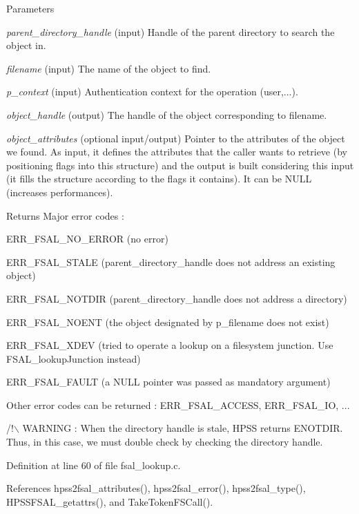\begin{DoxyParams}{Parameters}
\item[{\em parent\_\-directory\_\-handle}](input) Handle of the parent directory to search the object in. \item[{\em filename}](input) The name of the object to find. \item[{\em p\_\-context}](input) Authentication context for the operation (user,...). \item[{\em object\_\-handle}](output) The handle of the object corresponding to filename. \item[{\em object\_\-attributes}](optional input/output) Pointer to the attributes of the object we found. As input, it defines the attributes that the caller wants to retrieve (by positioning flags into this structure) and the output is built considering this input (it fills the structure according to the flags it contains). It can be NULL (increases performances).\end{DoxyParams}
\begin{DoxyReturn}{Returns}
Major error codes :
\begin{DoxyItemize}
\item ERR\_\-FSAL\_\-NO\_\-ERROR (no error)
\item ERR\_\-FSAL\_\-STALE (parent\_\-directory\_\-handle does not address an existing object)
\item ERR\_\-FSAL\_\-NOTDIR (parent\_\-directory\_\-handle does not address a directory)
\item ERR\_\-FSAL\_\-NOENT (the object designated by p\_\-filename does not exist)
\item ERR\_\-FSAL\_\-XDEV (tried to operate a lookup on a filesystem junction. Use FSAL\_\-lookupJunction instead)
\item ERR\_\-FSAL\_\-FAULT (a NULL pointer was passed as mandatory argument)
\item Other error codes can be returned : ERR\_\-FSAL\_\-ACCESS, ERR\_\-FSAL\_\-IO, ... 
\end{DoxyItemize}
\end{DoxyReturn}


/!$\backslash$ WARNING : When the directory handle is stale, HPSS returns ENOTDIR. Thus, in this case, we must double check by checking the directory handle.

Definition at line 60 of file fsal\_\-lookup.c.

References hpss2fsal\_\-attributes(), hpss2fsal\_\-error(), hpss2fsal\_\-type(), HPSSFSAL\_\-getattrs(), and TakeTokenFSCall().

